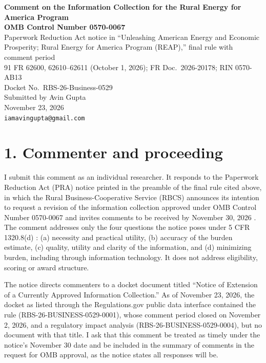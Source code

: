 \documentclass[11pt]{article}
\begin{document}
\begin{center}
{\large\bfseries Comment on the Information Collection for the Rural Energy for America
Program\\[3pt] OMB Control Number 0570-0067}\\[6pt]
Paperwork Reduction Act notice in ``Unleashing American Energy and Economic Prosperity;
Rural Energy for America Program (REAP),'' final rule with comment period\\
91 FR 62600, 62610--62611 (October 1, 2026); FR Doc.\ 2026-20178; RIN 0570-AB13\\
Docket No.\ RBS-26-Business-0529\\[6pt]
Submitted by Avin Gupta\\
November 23, 2026\\
\texttt{iamavingupta@gmail.com}
\end{center}

\section*{1. Commenter and proceeding}

I submit this comment as an individual researcher. It responds to the Paperwork
Reduction Act (PRA) notice printed in the preamble of the final rule cited above, in
which the Rural Business-Cooperative Service (RBCS) announces its intention to request a
revision of the information collection approved under OMB Control Number 0570-0067 and
invites comments to be received by November 30, 2026 \cite{fr2026reap}. The comment
addresses only the four questions the notice poses under 5 CFR 1320.8(d)
\cite{cfr1320_8}: (a) necessity and practical utility, (b) accuracy of the burden
estimate, (c) quality, utility and clarity of the information, and (d) minimizing burden,
including through information technology. It does not address eligibility, scoring or
award structure.

The notice directs commenters to a docket document titled ``Notice of Extension of a
Currently Approved Information Collection.'' As of November 23, 2026, the docket as
listed through the Regulations.gov public data interface contained the rule
(RBS-26-BUSINESS-0529-0001), whose comment period closed on November 2, 2026, and a
regulatory impact analysis (RBS-26-BUSINESS-0529-0004), but no document with that title.
I ask that this comment be treated as timely under the notice's November 30 date and be
included in the summary of comments in the request for OMB approval, as the notice
states all responses will be.
\end{document}
